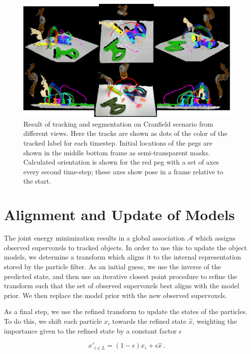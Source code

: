 \begin{figure}[!ht]
  \centering
  \includegraphics[scale=0.94]{figures/IROS2013/TrajectoriesNew.pdf}
  \caption[Cranfield Tracking Results]{Result of tracking and segmentation on Cranfield scenario from different views. Here the tracks are shown as dots of the color of the tracked label for each timestep. Initial locations of the pegs are shown in the middle bottom frame as semi-transparent masks. Calculated orientation is shown for the red peg with a set of axes every second time-step; these axes show pose in a frame relative to the start. }
  \label{fig:Trajectories}
\end{figure}

\section{Alignment and Update of Models}
The joint energy minimization results in a global association $\mathcal{A}$ which assigns observed supervoxels to tracked objects. In order to use this to update the object models, we determine a transform which aligns it to the internal representation stored by the particle filter. As an initial guess, we use the inverse of the predicted state, and then use an iterative closest point \cite{ICPChetverikov} procedure to refine the transform such that the set of observed supervoxels best aligns with the model prior. We then replace the model prior with the new observed supervoxels. 

As a final step, we use the refined transform to update the states of the particles. To do this, we shift each particle $x_i$ towards the refined state $\hat{x}$, weighting the importance given to the refined state by a constant factor $\epsilon$

\begin{equation}
\label{eqn:PFUpdate}
x'_{i \in L} = (1-\epsilon) x_i + \epsilon \hat{x}~.
\end{equation}

